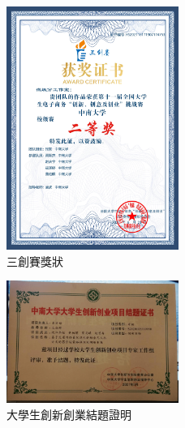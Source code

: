 \documentclass[classical]{einfart}
\begin{document}
\begin{figure}[H]
  \centering
  \includegraphics[width=0.5\textwidth]{img/三創賽獎狀-min.jpg}
  \caption{三創賽獎狀}
\end{figure}

\begin{figure}[H]
  \centering
  \includegraphics[width=0.5\textwidth]{img/2021_-min.png}
  \caption{大學生創新創業結題證明}
\end{figure}
\end{document}
